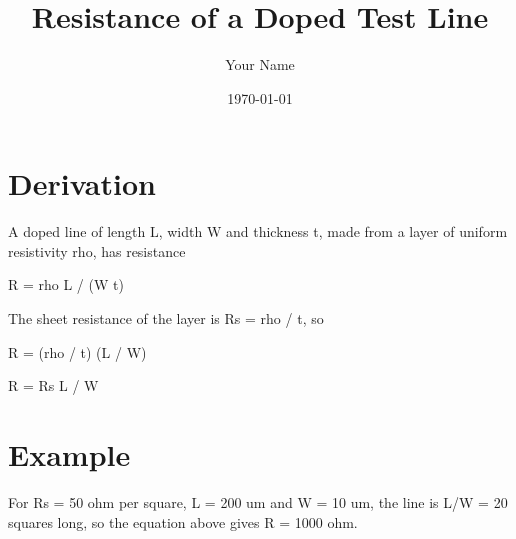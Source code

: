 \documentclass{article}
\title{Resistance of a Doped Test Line}
\author{Your Name}
\date{\today}
\begin{document}
\maketitle

\section{Derivation}
A doped line of length L, width W and thickness t, made from a layer of
uniform resistivity rho, has resistance

R = rho L / (W t)

The sheet resistance of the layer is Rs = rho / t, so

R = (rho / t) (L / W)

R = Rs L / W

\section{Example}
For Rs = 50 ohm per square, L = 200 um and W = 10 um, the line is
L/W = 20 squares long, so the equation above gives R = 1000 ohm.
\end{document}
